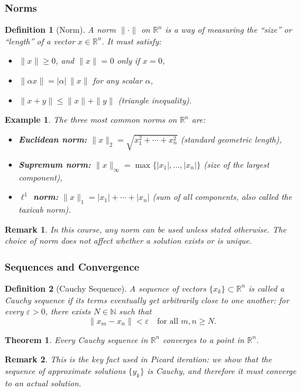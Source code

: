 \documentclass{article}
\newtheorem{theorem}{Theorem}
\newtheorem{definition}{Definition}
\newtheorem*{example}{Example}
\newtheorem{remark}{Remark}
\newcommand{\R}{\mathbb{R}}
\begin{document}
\subsubsection{Norms}
\begin{definition}[Norm]
    A norm $\|\cdot\|$ on $\R^n$ is a way of measuring the 
    ``size'' or ``length'' of a vector $x \in \R^n$. It must satisfy:
    \begin{itemize}
        \item $\|x\| \geq 0$, and $\|x\| = 0$ only if $x = 0$,
        \item $\|\alpha x\| = |\alpha|\,\|x\|$ for any scalar $\alpha$,
        \item $\|x + y\| \leq \|x\| + \|y\|$ \quad (triangle inequality).
    \end{itemize}
\end{definition}
\begin{example}
    The three most common norms on $\R^n$ are:
    \begin{itemize}
        \item \textbf{Euclidean norm:} $\|x\|_2 = \sqrt{x_1^2 + \cdots + x_n^2}$ 
        (standard geometric length),
        \item \textbf{Supremum norm:} $\|x\|_\infty = \max\{|x_1|,\ldots,|x_n|\}$ 
        (size of the largest component),
        \item \textbf{$\ell^1$ norm:} $\|x\|_1 = |x_1| + \cdots + |x_n|$ 
        (sum of all components, also called the taxicab norm).
    \end{itemize}
\end{example}
\begin{remark}
    In this course, any norm can be used unless stated otherwise. The choice 
    of norm does not affect whether a solution exists or is unique.
\end{remark}

\subsubsection{Sequences and Convergence}
\begin{definition}[Cauchy Sequence]
    A sequence of vectors $\{x_k\} \subset \R^n$ is called a Cauchy 
    sequence if its terms eventually get arbitrarily close to one another:
    for every $\varepsilon > 0$, there exists $N \in \mathbb{N}$ such that
    \[\|x_m - x_n\| < \varepsilon \quad \text{for all } m, n \geq N.\]
\end{definition}
\begin{theorem}
    Every Cauchy sequence in $\R^n$ converges to a point in $\R^n$.
\end{theorem}
\begin{remark}
    This is the key fact used in Picard iteration: we show that the sequence 
    of approximate solutions $\{y_k\}$ is Cauchy, and therefore it must 
    converge to an actual solution.
\end{remark}
\end{document}
